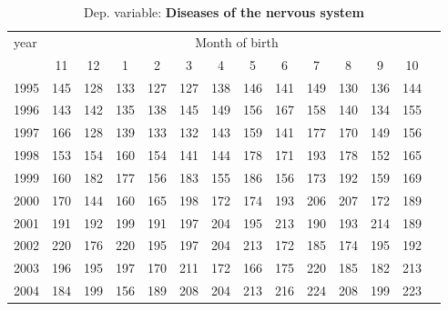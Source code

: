  \begin{table}[H] \begin{threeparttable} \centering \caption{Dep. variable: \textbf{Diseases of the nervous system}} {\def\sym#1{\ifmmode^{#1}\else\(^{#1}\)\fi} \begin{tabular}{l*{13}{c}} \toprule year & \multicolumn{12}{c}{Month of birth} \\ \cmidrule(lr){2-13} 
            &          11&          12&           1&           2&           3&           4&           5&           6&           7&           8&           9&          10\\
1995        &         145&         128&         133&         127&         127&         138&         146&         141&         149&         130&         136&         144\\
1996        &         143&         142&         135&         138&         145&         149&         156&         167&         158&         140&         134&         155\\
1997        &         166&         128&         139&         133&         132&         143&         159&         141&         177&         170&         149&         156\\
1998        &         153&         154&         160&         154&         141&         144&         178&         171&         193&         178&         152&         165\\
1999        &         160&         182&         177&         156&         183&         155&         186&         156&         173&         192&         159&         169\\
2000        &         170&         144&         160&         165&         198&         172&         174&         193&         206&         207&         172&         189\\
2001        &         191&         192&         199&         191&         197&         204&         195&         213&         190&         193&         214&         189\\
2002        &         220&         176&         220&         195&         197&         204&         213&         172&         185&         174&         195&         192\\
2003        &         196&         195&         197&         170&         211&         172&         166&         175&         220&         185&         182&         213\\
2004        &         184&         199&         156&         189&         208&         204&         213&         216&         224&         208&         199&         223\\

\end{tabular}}
\end{threeparttable}
\end{table}
